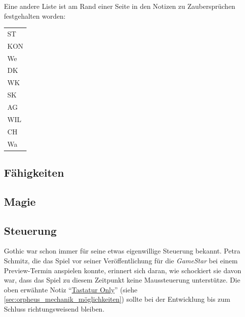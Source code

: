 \documentclass[a5paper,pagesize,numbers=noenddot]{scrbook}
\begin{document}
Eine andere Liste ist am Rand einer Seite in den Notizen zu Zaubersprüchen festgehalten worden:

\vspace{1em}
\begin{tabular}{l}
   ST    \\
   KON   \\
   We    \\
   DK    \\
   WK    \\
   SK    \\
   AG    \\
   WIL   \\
   CH    \\
   Wa    \\\hline
\end{tabular}


\subsection{Fähigkeiten}\label{sec:orpheus_mechanik_faehigkeiten}



\subsection{Magie}\label{sec:orpheus_mechanik_magie}


\subsection{Steuerung}\label{sec:orpheus_mechanik_steuerung}
Gothic war schon immer für seine etwas eigenwillige Steuerung bekannt.
Petra Schmitz, die das Spiel vor seiner Veröffentlichung für die \textit{GameStar} bei einem Preview-Termin anspielen konnte, erinnert sich daran, wie schockiert sie davon war, dass das Spiel zu diesem Zeitpunkt keine Maussteuerung unterstütze.\autocite{schmitz_maussteuerung_2021}
Die oben erwähnte Notiz \enquote{\uline{Tastatur Only}}\autocite[S.~1]{orpheus_interface} (siehe \autoref{sec:orpheus_mechanik_möglichkeiten}) sollte bei der Entwicklung bis zum Schluss richtungsweisend bleiben.
\end{document}
